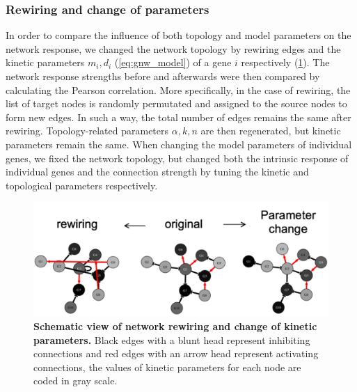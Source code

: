 
\subsubsection{Rewiring and change of parameters}
In order to compare the influence of both topology and model parameters on 
the network response, we changed the network topology by rewiring edges and 
the kinetic parameters $m_i, d_i$ (\ref{eq:gnw_model}) of a gene $i$ 
respectively (\ref{fig:rewiring_scheme}). The
network response strengths before and afterwards were then compared by
calculating the Pearson correlation. More specifically, in the case of 
rewiring, the list of target nodes is randomly permutated and assigned to the
source nodes to form new edges. 
In such a way, the total number of edges
remains the same after rewiring. 
Topology-related parameters $\alpha, k, n$ are
then regenerated, but kinetic parameters remain the same. 
When changing the model parameters of individual genes, we fixed the network
topology, but changed both the intrinsic response of individual genes and 
the connection strength by tuning the kinetic and topological parameters 
respectively.

\begin{figure}[!ht]
\begin{center}
\includegraphics[width=\textwidth]{rewiring_scheme.pdf}
\end{center}
\caption[Schematic view of network rewiring and kinetic parameter change]{
{\bf Schematic view of network rewiring and change of kinetic parameters.} 
Black edges with a blunt head represent inhibiting
connections and red edges with an arrow head represent activating
connections, the values of kinetic parameters for each node are 
coded in gray scale. 
}
\label{fig:rewiring_scheme}
\end{figure}

